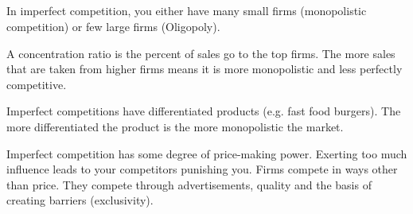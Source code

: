 \subsection{}
In imperfect competition, you either have many small firms (monopolistic competition) or few large firms (Oligopoly).
\par
A concentration ratio is the percent of sales go to the top firms. The more sales that are taken from higher firms means it is more monopolistic and less perfectly competitive.
\par
Imperfect competitions have differentiated products (e.g. fast food burgers). The more differentiated the product is the more monopolistic the market.
\par
Imperfect competition has some degree of price-making power. Exerting too much influence leads to your competitors punishing you. Firms compete in ways other than price. They compete through
advertisements, quality and the basis of creating barriers (exclusivity).